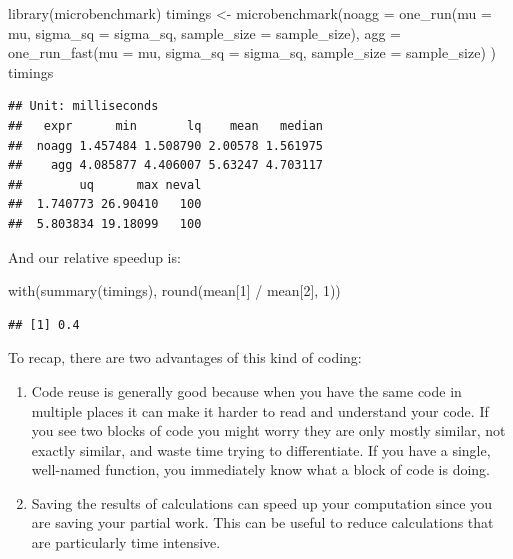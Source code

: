 \documentclass[
]{book}
\newenvironment{Shaded}{\begin{snugshade}}{\end{snugshade}}
\newcommand{\AttributeTok}[1]{\textcolor[rgb]{0.77,0.63,0.00}{#1}}
\newcommand{\DecValTok}[1]{\textcolor[rgb]{0.00,0.00,0.81}{#1}}
\newcommand{\FunctionTok}[1]{\textcolor[rgb]{0.00,0.00,0.00}{#1}}
\newcommand{\NormalTok}[1]{#1}
\newcommand{\OtherTok}[1]{\textcolor[rgb]{0.56,0.35,0.01}{#1}}
\newcommand{\SpecialCharTok}[1]{\textcolor[rgb]{0.00,0.00,0.00}{#1}}
\begin{document}
\begin{Shaded}
\begin{Highlighting}[]
\FunctionTok{library}\NormalTok{(microbenchmark)}
\NormalTok{timings }\OtherTok{\textless{}{-}} \FunctionTok{microbenchmark}\NormalTok{(}\AttributeTok{noagg =} \FunctionTok{one\_run}\NormalTok{(}\AttributeTok{mu =}\NormalTok{ mu, }\AttributeTok{sigma\_sq =}\NormalTok{ sigma\_sq, }
                                          \AttributeTok{sample\_size =}\NormalTok{ sample\_size),}
                          \AttributeTok{agg =} \FunctionTok{one\_run\_fast}\NormalTok{(}\AttributeTok{mu =}\NormalTok{ mu, }\AttributeTok{sigma\_sq =}\NormalTok{ sigma\_sq, }
                                             \AttributeTok{sample\_size =}\NormalTok{ sample\_size) )}
\NormalTok{timings}
\end{Highlighting}
\end{Shaded}

\begin{verbatim}
## Unit: milliseconds
##   expr      min       lq    mean   median
##  noagg 1.457484 1.508790 2.00578 1.561975
##    agg 4.085877 4.406007 5.63247 4.703117
##        uq      max neval
##  1.740773 26.90410   100
##  5.803834 19.18099   100
\end{verbatim}

And our relative speedup is:

\begin{Shaded}
\begin{Highlighting}[]
\FunctionTok{with}\NormalTok{(}\FunctionTok{summary}\NormalTok{(timings), }\FunctionTok{round}\NormalTok{(mean[}\DecValTok{1}\NormalTok{] }\SpecialCharTok{/}\NormalTok{ mean[}\DecValTok{2}\NormalTok{], }\DecValTok{1}\NormalTok{))}
\end{Highlighting}
\end{Shaded}

\begin{verbatim}
## [1] 0.4
\end{verbatim}

To recap, there are two advantages of this kind of coding:

\begin{enumerate}
\def\labelenumi{\arabic{enumi}.}
\item
  Code reuse is generally good because when you have the same code in multiple places it can make it harder to read and understand your code. If you see two blocks of code you might worry they are only mostly similar, not exactly similar, and waste time trying to differentiate. If you have a single, well-named function, you immediately know what a block of code is doing.
\item
  Saving the results of calculations can speed up your computation since you are saving your partial work. This can be useful to reduce calculations that are particularly time intensive.
\end{enumerate}
\end{document}
